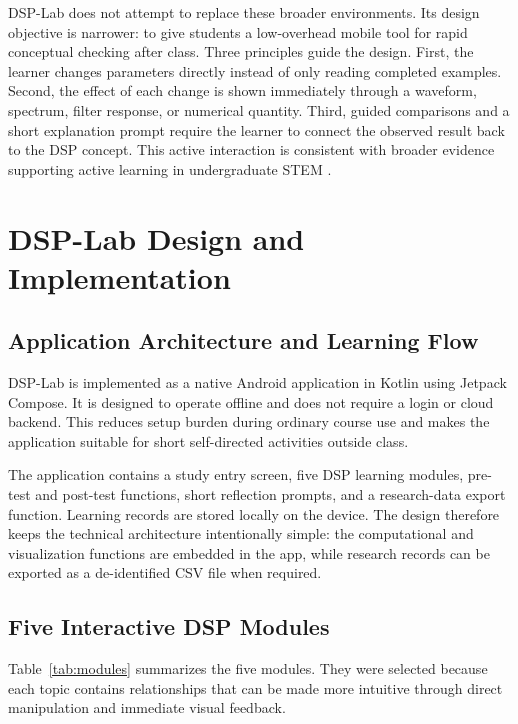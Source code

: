\documentclass[11pt,a4paper]{article}
\begin{document}
DSP-Lab does not attempt to replace these broader environments. Its design objective is narrower: to give students a low-overhead mobile tool for rapid conceptual checking after class. Three principles guide the design. First, the learner changes parameters directly instead of only reading completed examples. Second, the effect of each change is shown immediately through a waveform, spectrum, filter response, or numerical quantity. Third, guided comparisons and a short explanation prompt require the learner to connect the observed result back to the DSP concept. This active interaction is consistent with broader evidence supporting active learning in undergraduate STEM \citep{freeman2014}.



\section{DSP-Lab Design and Implementation}
\subsection{Application Architecture and Learning Flow}
DSP-Lab is implemented as a native Android application in Kotlin using Jetpack Compose. It is designed to operate offline and does not require a login or cloud backend. This reduces setup burden during ordinary course use and makes the application suitable for short self-directed activities outside class.

The application contains a study entry screen, five DSP learning modules, pre-test and post-test functions, short reflection prompts, and a research-data export function. Learning records are stored locally on the device. The design therefore keeps the technical architecture intentionally simple: the computational and visualization functions are embedded in the app, while research records can be exported as a de-identified CSV file when required.

\subsection{Five Interactive DSP Modules}
Table~\ref{tab:modules} summarizes the five modules. They were selected because each topic contains relationships that can be made more intuitive through direct manipulation and immediate visual feedback.
\end{document}
